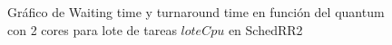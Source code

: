 \begin{figure}[H]
\hfill
{}
\hfill
{}
\hfill
\caption{Gráfico de Waiting time y turnaround time en función del quantum con 2 cores para lote de tareas $loteCpu$ en SchedRR2}
\end{figure}

